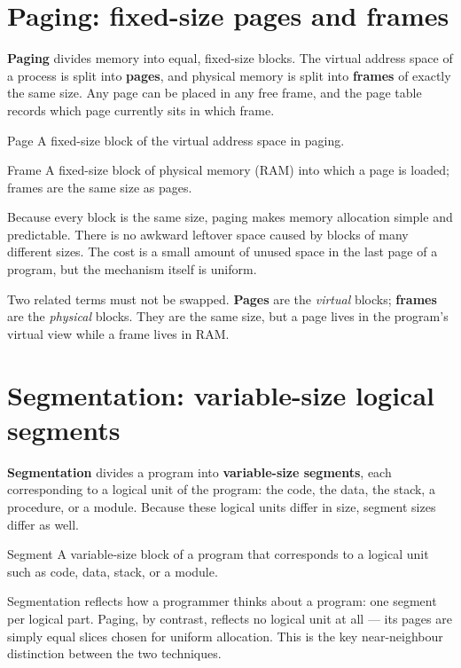\section{Paging: fixed-size pages and frames}
\textbf{Paging} divides memory into equal, fixed-size blocks. The virtual
address space of a process is split into \textbf{pages}, and physical memory is
split into \textbf{frames} of exactly the same size. Any page can be placed in
any free frame, and the page table records which page currently sits in which
frame.

\begin{definitionbox}{Page}
A fixed-size block of the virtual address space in paging.
\end{definitionbox}

\begin{definitionbox}{Frame}
A fixed-size block of physical memory (RAM) into which a page is loaded; frames
are the same size as pages.
\end{definitionbox}

Because every block is the same size, paging makes memory allocation simple and
predictable. There is no awkward leftover space caused by blocks of many
different sizes. The cost is a small amount of unused space in the last page of
a program, but the mechanism itself is uniform.

Two related terms must not be swapped. \textbf{Pages} are the \emph{virtual}
blocks; \textbf{frames} are the \emph{physical} blocks. They are the same size,
but a page lives in the program's virtual view while a frame lives in RAM.

\section{Segmentation: variable-size logical segments}
\textbf{Segmentation} divides a program into \textbf{variable-size segments},
each corresponding to a logical unit of the program: the code, the data, the
stack, a procedure, or a module. Because these logical units differ in size,
segment sizes differ as well.

\begin{definitionbox}{Segment}
A variable-size block of a program that corresponds to a logical unit such as
code, data, stack, or a module.
\end{definitionbox}

Segmentation reflects how a programmer thinks about a program: one segment per
logical part. Paging, by contrast, reflects no logical unit at all --- its pages
are simply equal slices chosen for uniform allocation. This is the key
near-neighbour distinction between the two techniques.

